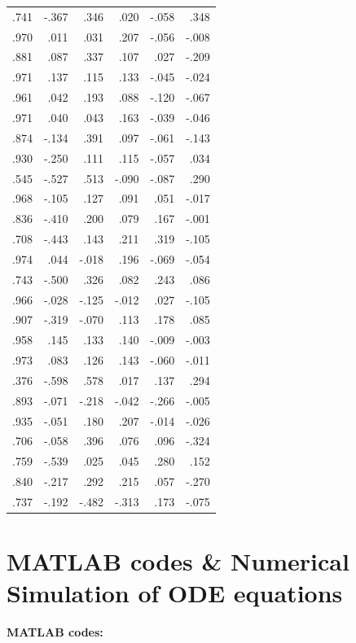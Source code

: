 \documentclass{mcmthesis}
\begin{document}
\begin{appendices}
\begin{table}[htbp]
\begin{tabular}{|r|r|r|r|r|r|}
    .741  & -.367 & .346  & .020  & -.058 & .348 \\
    .970  & .011  & .031  & .207  & -.056 & -.008 \\
    .881  & .087  & .337  & .107  & .027  & -.209 \\
    .971  & .137  & .115  & .133  & -.045 & -.024 \\
    .961  & .042  & .193  & .088  & -.120 & -.067 \\
    .971  & .040  & .043  & .163  & -.039 & -.046 \\
    .874  & -.134 & .391  & .097  & -.061 & -.143 \\
    .930  & -.250 & .111  & .115  & -.057 & .034 \\
    .545  & -.527 & .513  & -.090 & -.087 & .290 \\
    .968  & -.105 & .127  & .091  & .051  & -.017 \\
    .836  & -.410 & .200  & .079  & .167  & -.001 \\
    .708  & -.443 & .143  & .211  & .319  & -.105 \\
    .974  & .044  & -.018 & .196  & -.069 & -.054 \\
    .743  & -.500 & .326  & .082  & .243  & .086 \\
    .966  & -.028 & -.125 & -.012 & .027  & -.105 \\
    .907  & -.319 & -.070 & .113  & .178  & .085 \\
    .958  & .145  & .133  & .140  & -.009 & -.003 \\
    .973  & .083  & .126  & .143  & -.060 & -.011 \\
    .376  & -.598 & .578  & .017  & .137  & .294 \\
    .893  & -.071 & -.218 & -.042 & -.266 & -.005 \\
    .935  & -.051 & .180  & .207  & -.014 & -.026 \\
    .706  & -.058 & .396  & .076  & .096  & -.324 \\
    .759  & -.539 & .025  & .045  & .280  & .152 \\
    .840  & -.217 & .292  & .215  & .057  & -.270 \\
    .737  & -.192 & -.482 & -.313 & .173  & -.075 \\
    \bottomrule
    \end{tabular}%
  \label{tab:addlabel}%
\end{table}%
\newpage
\section{MATLAB codes \& Numerical Simulation of ODE equations}
\textcolor[rgb]{0.98,0.00,0.00}{\textbf{MATLAB codes:}}


\end{appendices}
\end{document}
